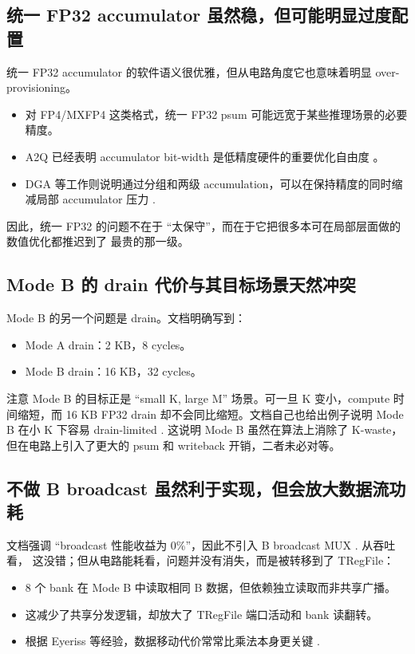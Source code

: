 \documentclass[UTF8,11pt,a4paper]{ctexart}
\newcommand{\modea}{Mode A}
\newcommand{\modeb}{Mode B}
\begin{document}
\subsection{统一 FP32 accumulator 虽然稳，但可能明显过度配置}

统一 FP32 accumulator 的软件语义很优雅，但从电路角度它也意味着明显 over-provisioning。

\begin{itemize}
  \item 对 FP4/MXFP4 这类格式，统一 FP32 psum 可能远宽于某些推理场景的必要精度。
  \item A2Q 已经表明 accumulator bit-width 是低精度硬件的重要优化自由度 \cite{a2q}。
  \item DGA 等工作则说明通过分组和两级 accumulation，可以在保持精度的同时缩减局部 accumulator 压力
  \cite{dga}.
\end{itemize}

因此，统一 FP32 的问题不在于 ``太保守''，而在于它把很多本可在局部层面做的数值优化都推迟到了
最贵的那一级。

\subsection{\modeb{} 的 drain 代价与其目标场景天然冲突}

\modeb{} 的另一个问题是 drain。文档明确写到：

\begin{itemize}
  \item \modea{} drain：2 KB，8 cycles。
  \item \modeb{} drain：16 KB，32 cycles。
\end{itemize}

注意 \modeb{} 的目标正是 ``small K, large M'' 场景。可一旦 K 变小，compute 时间缩短，而 16 KB
FP32 drain 却不会同比缩短。文档自己也给出例子说明 \modeb{} 在小 K 下容易 drain-limited
\cite{outercube}. 这说明 \modeb{} 虽然在算法上消除了 K-waste，但在电路上引入了更大的 psum
和 writeback 开销，二者未必对等。

\subsection{不做 B broadcast 虽然利于实现，但会放大数据流功耗}

文档强调 ``broadcast 性能收益为 0\%''，因此不引入 B broadcast MUX \cite{outercube}. 从吞吐看，
这没错；但从电路能耗看，问题并没有消失，而是被转移到了 TRegFile：

\begin{itemize}
  \item 8 个 bank 在 \modeb{} 中读取相同 B 数据，但依赖独立读取而非共享广播。
  \item 这减少了共享分发逻辑，却放大了 TRegFile 端口活动和 bank 读翻转。
  \item 根据 Eyeriss 等经验，数据移动代价常常比乘法本身更关键 \cite{eyeriss}.
\end{itemize}
\end{document}
